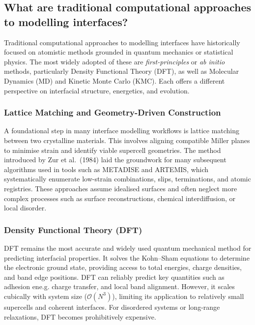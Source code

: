 \subsection{What are traditional computational approaches to modelling interfaces?} 
 
Traditional computational approaches to modelling interfaces have historically focused on atomistic methods grounded in quantum mechanics or statistical physics. The most widely adopted of these are \textit{first-principles} or \textit{ab initio} methods, particularly Density Functional Theory (DFT), as well as Molecular Dynamics (MD) and Kinetic Monte Carlo (KMC). Each offers a different perspective on interfacial structure, energetics, and evolution. 
 
\subsubsection{Lattice Matching and Geometry-Driven Construction} 
 
A foundational step in many interface modelling workflows is lattice matching between two crystalline materials. This involves aligning compatible Miller planes to minimise strain and identify viable supercell geometries. The method introduced by Zur et al.~(1984) laid the groundwork for many subsequent algorithms used in tools such as \textsc{METADISE} and \textsc{ARTEMIS}, which systematically enumerate low-strain combinations, slips, terminations, and atomic registries. These approaches assume idealised surfaces and often neglect more complex processes such as surface reconstructions, chemical interdiffusion, or local disorder. 
 
\subsubsection{Density Functional Theory (DFT)} 
 
DFT remains the most accurate and widely used quantum mechanical method for predicting interfacial properties. It solves the Kohn--Sham equations to determine the electronic ground state, providing access to total energies, charge densities, and band edge positions. DFT can reliably predict key quantities such as adhesion ene.g. charge transfer, and local band alignment. However, it scales cubically with system size ($\mathcal{O}(N^3)$), limiting its application to relatively small supercells and coherent interfaces. For disordered systems or long-range relaxations, DFT becomes prohibitively expensive. 
 
